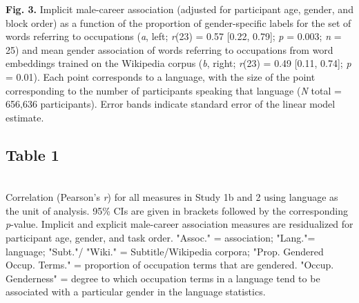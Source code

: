 \documentclass[9pt,twocolumn]{pnas-new}
\begin{document}
{\bf Fig. 3.} Implicit male-career association (adjusted for participant age,
gender, and block order) as a function of the proportion of gender-specific labels for the set of words referring to occupations ({\it a}, left; \emph{r}(23) = 0.57 {[}0.22, 0.79{]}; \emph{p} = 0.003; \emph{n} = 25) and  mean gender association of words
referring to occupations from word embeddings trained on the Wikipedia corpus ({\it b}, right; \emph{r}(23) = 0.49 {[}0.11, 0.74{]}; \emph{p} = 0.01). Each point corresponds to a language, with the size of the point corresponding to the number of participants
speaking that language ({\it N} total = 656,636 participants). Error bands indicate standard error of the
linear model estimate.
\subsection*{Table 1}~\\

Correlation (Pearson’s  \emph{r}) for all measures in Study 1b and 2 using language as the unit of analysis. 95\% CIs are given in brackets followed by the corresponding {\it p}-value. Implicit and explicit male-career association measures are residualized for participant age, gender, and task order. "Assoc." = association; "Lang."= language; "Subt."/ "Wiki." = Subtitle/Wikipedia corpora; "Prop. Gendered Occup. Terms." = proportion of occupation terms that are gendered. "Occup. Genderness" = degree to which occupation terms in a language tend to be associated with a particular gender in the language statistics.
\newpage


\newpage
\end{document}
